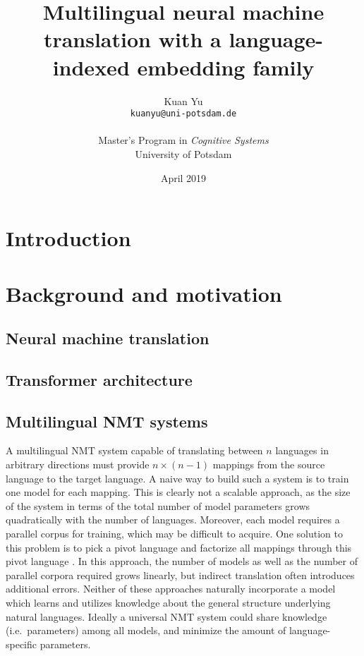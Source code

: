 \documentclass[11pt]{article}
\title{Multilingual neural machine translation with a language-indexed embedding family}
\author{%
  Kuan Yu\\
  \texttt{kuanyu@uni-potsdam.de}\\
  \\
  Master's Program in \emph{Cognitive Systems}\\
  University of Potsdam}
\date{April 2019}
\begin{document}
\maketitle

\begin{abstract}
\end{abstract}

\section{Introduction}\label{sec:introduction}

\section{Background and motivation}\label{sec:backgr-motiv}

\subsection{Neural machine translation}\label{sec:neur-mach-transl}




\subsection{Transformer architecture}\label{sec:transf-arch}


\subsection{Multilingual NMT systems}\label{sec:mult-nmt-syst}

A multilingual NMT system capable of translating between \(n\) languages
in arbitrary directions must provide \(n \times (n - 1)\) mappings from the source language to the target language.
A naive way to build such a system is to train one model for each mapping.
This is clearly not a scalable approach,
as the size of the system in terms of the total number of model parameters grows quadratically
with the number of languages.
Moreover, each model requires a parallel corpus for training,
which may be difficult to acquire.
One solution to this problem is to pick a pivot language
and factorize all mappings through this pivot language \parencite{utiyama2007comparison}.
In this approach, the number of models as well as the number of parallel corpora required grows linearly,
but indirect translation often introduces additional errors.
Neither of these approaches naturally incorporate a model which learns and utilizes knowledge about
the general structure underlying natural languages.
Ideally a universal NMT system could share knowledge (i.e.\ parameters) among all models,
and minimize the amount of language-specific parameters.
\end{document}
